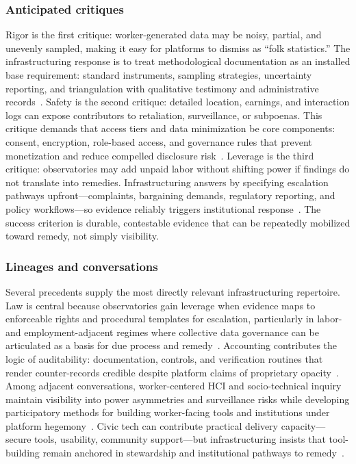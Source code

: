 \documentclass[acmsmall,screen]{acmart}
\begin{document}
\subsubsection*{Anticipated critiques}
Rigor is the first critique: worker-generated data may be noisy, partial, and unevenly sampled, making it easy for platforms to dismiss as ``folk statistics.'' The infrastructuring response is to treat methodological documentation as an installed base requirement: standard instruments, sampling strategies, uncertainty reporting, and triangulation with qualitative testimony and administrative records~\cite{dalalLessonsWorkersInquiry2024,calacciBargainingBlackBoxDesigning2022}. Safety is the second critique: detailed location, earnings, and interaction logs can expose contributors to retaliation, surveillance, or subpoenas. This critique demands that access tiers and data minimization be core components: consent, encryption, role-based access, and governance rules that prevent monetization and reduce compelled disclosure risk~\cite{doDesigningGigWorker2024,steinYouAreYou2023}. Leverage is the third critique: observatories may add unpaid labor without shifting power if findings do not translate into remedies. Infrastructuring answers by specifying escalation pathways upfront---complaints, bargaining demands, regulatory reporting, and policy workflows---so evidence reliably triggers institutional response~\cite{vincentDataLeverageFramework2021a,calacciOrganizingEndEmployment2022,nagarajraoRideshareTransparencyTranslating2025}. The success criterion is durable, contestable evidence that can be repeatedly mobilized toward remedy, not simply visibility.

\subsubsection*{Lineages and conversations}
Several precedents supply the most directly relevant infrastructuring repertoire. Law is central because observatories gain leverage when evidence maps to enforceable rights and procedural templates for escalation, particularly in labor- and employment-adjacent regimes where collective data governance can be articulated as a basis for due process and remedy~\cite{calacciAccessUnderstandingCollective2023}. Accounting contributes the logic of auditability: documentation, controls, and verification routines that render counter-records credible despite platform claims of proprietary opacity~\cite{calacciBargainingBlackBoxDesigning2022,binnsNotEvenNice2025}. Among adjacent conversations, worker-centered HCI and socio-technical inquiry maintain visibility into power asymmetries and surveillance risks while developing participatory methods for building worker-facing tools and institutions under platform hegemony~\cite{steinYouAreYou2023,zhangStakeholderCenteredAIDesign2023}. Civic tech can contribute practical delivery capacity---secure tools, usability, community support---but infrastructuring insists that tool-building remain anchored in stewardship and institutional pathways to remedy~\cite{hsiehGig2GetherDatasharingEmpower2025,doDesigningGigWorker2024}.
\end{document}
